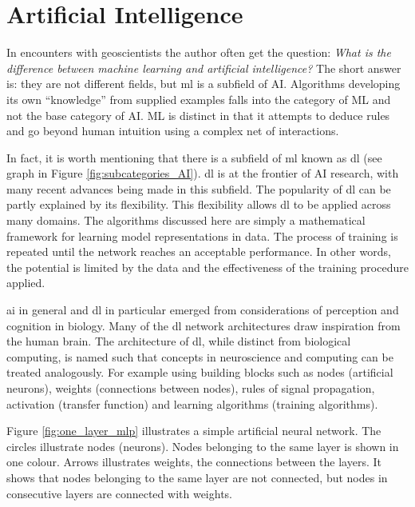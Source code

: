 \section{Artificial Intelligence} \label{sec:ai}

In encounters with geoscientists the author often get the question: \textit{What is the difference between machine learning and artificial intelligence?} The short answer is: they are not different fields, but \acrshort{ml} is a subfield of AI. Algorithms developing its own ``knowledge'' from supplied examples falls into the category of ML and not the base category of AI. ML is distinct in that it attempts to deduce rules and go beyond human intuition using a complex net of interactions. 

In fact, it is worth mentioning that there is a subfield of \acrshort{ml} known as \acrshort{dl} (see graph in Figure \ref{fig:subcategories_AI}). %
\acrshort{dl} is at the frontier of AI research, with many recent advances being made in this subfield. The popularity of \acrshort{dl} can be partly explained by its flexibility. This flexibility allows \acrshort{dl} to be applied across many domains. The algorithms discussed here are simply a mathematical framework for learning model representations in data. The process of training is repeated until the network reaches an acceptable performance. In other words, the potential is limited by the data and the effectiveness of the training procedure applied.


\acrshort{ai} in general and \acrshort{dl} in particular emerged from considerations of perception and cognition in biology. Many of the \acrshort{dl} network architectures draw inspiration from the human brain. The architecture of \acrshort{dl}, while distinct from biological computing, is named such that concepts in neuroscience and computing can be treated analogously. For example using building blocks such as nodes (artificial neurons), weights (connections between nodes), rules of signal propagation, activation (transfer function) and learning algorithms (training algorithms).

Figure \ref{fig:one_layer_mlp} illustrates a simple artificial neural network. The circles illustrate nodes (neurons). Nodes belonging to the same layer is shown in one colour. Arrows illustrates weights, the connections between the layers. It shows that nodes belonging to the same layer are not connected, but nodes in consecutive layers are connected with weights. 


